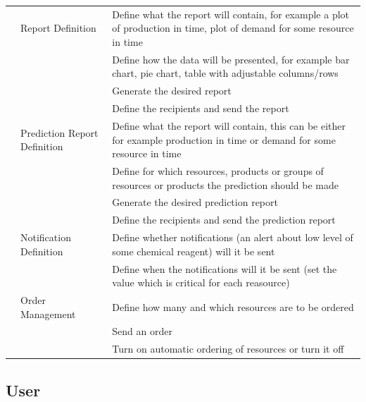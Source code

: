 \documentclass[a4paper,11pt,twoside]{report}
\theoremstyle{definition}
\begin{document}
\begin{longtable}{|p{3cm}|p{3cm}|p{10cm}|}
\texttt{} & Report \mbox{Definition} & Define what the report will contain, for example a plot of production in time, plot of demand for some resource in time\\ \cline{3-3}
\texttt{} & & Define how the data will be presented, for example bar chart, pie chart, table with adjustable columns/rows \\ \cline{3-3}
\texttt{} & & Generate the desired report \\ \cline{3-3}
\texttt{} & & Define the recipients and send the report \\ \cline{2-3}
\texttt{} & Prediction Report \mbox{Definition} & Define what the report will contain, this can be either for example production in time or demand for some resource in time\\ \cline{3-3}
\texttt{} & & Define for which resources, products or groups of resources or products the prediction should be made\\ \cline{3-3}
\texttt{} & & Generate the desired prediction report \\ \cline{3-3}

\texttt{} & & Define the recipients and send the prediction report \\ \cline{2-3}
\texttt{} & Notification \mbox{Definition} & Define whether notifications (an alert about low level of some chemical reagent) will it be sent\\ \cline{3-3}
\texttt{} & & Define when the notifications will it be sent (set the value which is critical for each reasource)\\ \cline{2-3}
\texttt{} & Order \mbox{Management} & Define how many and which resources are to be ordered\\ \cline{3-3}
\texttt{} & & Send an order\\ \cline{3-3}
\texttt{} & & Turn on automatic ordering of resources or turn it off\\ \hline

\end{longtable}


\pagebreak
\subsection{User}
\end{document}
